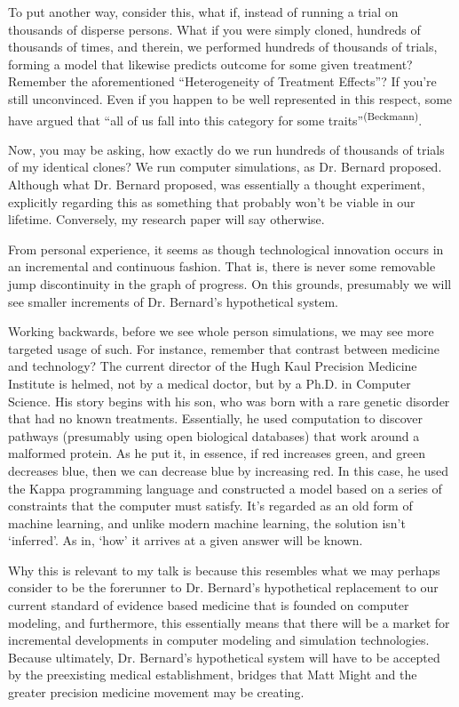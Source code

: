 To put another way, consider this, what if, instead of running a trial on thousands of disperse persons. What if you were simply cloned, hundreds of thousands of times, and therein, we performed hundreds of thousands of trials, forming a model that likewise predicts outcome for some given treatment? Remember the aforementioned ``Heterogeneity of Treatment Effects''? If you're still unconvinced. Even if you happen to be well represented in this respect, some have argued that ``all of us fall into this category for some traits''\textsuperscript{(Beckmann)}. 

Now, you may be asking, how exactly do we run hundreds of thousands of trials of my identical clones? We run computer simulations, as Dr. Bernard proposed. Although what Dr. Bernard proposed, was essentially a thought experiment, explicitly regarding this as something that probably won't be viable in our lifetime. Conversely, my research paper will say otherwise.

From personal experience, it seems as though technological innovation occurs in an incremental and continuous fashion. That is, there is never some removable jump discontinuity in the graph of progress. On this grounds, presumably we will see smaller increments of Dr. Bernard's hypothetical system. 


Working backwards, before we see whole person simulations, we may see more targeted usage of such. For instance, remember that contrast between medicine and technology? The current director of the Hugh Kaul Precision Medicine Institute is helmed, not by a medical doctor, but by a Ph.D. in Computer Science. His story begins with his son, who was born with a rare genetic disorder that had no known treatments. Essentially, he used computation to discover pathways (presumably using open biological databases) that work around a malformed protein. As he put it, in essence, if red increases green, and green decreases blue, then we can decrease blue by increasing red. In this case, he used the Kappa programming language and constructed a model based on a series of constraints that the computer must satisfy. It's regarded as an old form of machine learning, and unlike modern machine learning, the solution isn’t ‘inferred’. As in, ‘how’ it arrives at a given answer will be known.

Why this is relevant to my talk is because this resembles what we may perhaps consider to be the forerunner to Dr. Bernard's hypothetical replacement to our current standard of evidence based medicine that is founded on computer modeling, and furthermore, this essentially means that there will be a market for incremental developments in computer modeling and simulation technologies. Because ultimately, Dr. Bernard's hypothetical system will have to be accepted by the preexisting medical establishment, bridges that Matt Might and the greater precision medicine movement may be creating. 


